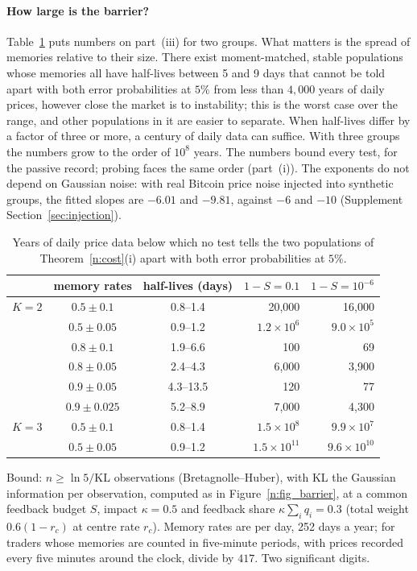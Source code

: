 \documentclass[12pt]{article}
\theoremstyle{definition}
\theoremstyle{remark}
\begin{document}
\paragraph{How large is the barrier?} Table~\ref{n:tab_cal} puts numbers on part~(iii) for two groups. What matters is the spread of memories relative to their size. There exist moment-matched, stable populations whose memories all have half-lives between 5 and 9 days that cannot be told apart with both error probabilities at $5\%$ from less than $4{,}000$ years of daily prices, however close the market is to instability; this is the worst case over the range, and other populations in it are easier to separate. When half-lives differ by a factor of three or more, a century of daily data can suffice. With three groups the numbers grow to the order of $10^8$ years. The numbers bound every test, for the passive record; probing faces the same order (part~(i)). The exponents do not depend on Gaussian noise: with real Bitcoin price noise injected into synthetic groups, the fitted slopes are $-6.01$ and $-9.81$, against $-6$ and $-10$ (Supplement Section~\ref{sec:injection}).

\begin{table}[t]
\centering
\caption{Years of daily price data below which no test tells the two populations of Theorem~\ref{n:cost}(i) apart with both error probabilities at $5\%$.}
\label{n:tab_cal}
\begin{tabular}{cccrr}
\toprule
& memory rates & half-lives (days) & $1-S=0.1$ & $1-S=10^{-6}$\\
\midrule
$K=2$ & $0.5\pm0.1$ & 0.8--1.4 & 20{,}000 & 16{,}000\\
& $0.5\pm0.05$ & 0.9--1.2 & $1.2\times10^{6}$ & $9.0\times10^{5}$\\
& $0.8\pm0.1$ & 1.9--6.6 & 100 & 69\\
& $0.8\pm0.05$ & 2.4--4.3 & 6{,}000 & 3{,}900\\
& $0.9\pm0.05$ & 4.3--13.5 & 120 & 77\\
& $0.9\pm0.025$ & 5.2--8.9 & 7{,}000 & 4{,}300\\
\midrule
$K=3$ & $0.5\pm0.1$ & 0.8--1.4 & $1.5\times10^{8}$ & $9.9\times10^{7}$\\
& $0.5\pm0.05$ & 0.9--1.2 & $1.5\times10^{11}$ & $9.6\times10^{10}$\\
\bottomrule
\end{tabular}
\par\smallskip
\parbox{\textwidth}{\footnotesize Bound: $n\ge\ln 5/\mathrm{KL}$ observations (Bretagnolle--Huber), with KL the Gaussian information per observation, computed as in Figure~\ref{n:fig_barrier}, at a common feedback budget $S$, impact $\kappa=0.5$ and feedback share $\kappa\sum_iq_i=0.3$ (total weight $0.6(1-r_c)$ at centre rate $r_c$). Memory rates are per day, 252 days a year; for traders whose memories are counted in five-minute periods, with prices recorded every five minutes around the clock, divide by $417$. Two significant digits.}
\end{table}
\end{document}
